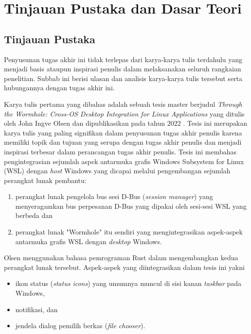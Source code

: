 \chapter{Tinjauan Pustaka dan Dasar Teori}

\section{Tinjauan Pustaka}

Penyusunan tugas akhir ini tidak terlepas dari karya-karya tulis terdahulu yang menjadi basis ataupun inspirasi penulis dalam melaksanakan seluruh rangkaian penelitian. Subbab ini berisi ulasan dan analisis karya-karya tulis tersebut serta hubungannya dengan tugas akhir ini.

Karya tulis pertama yang dibahas adalah sebuah tesis master berjudul \textit{Through the Wormhole: Cross-OS Desktop Integration for Linux Applications} yang ditulis oleh John Ingve Olsen dan dipublikasikan pada tahun 2022 \cite{olsen-2022-through-the-wormhole}. Tesis ini merupakan karya tulis yang paling signifikan dalam penyusunan tugas akhir penulis karena memiliki topik dan tujuan yang serupa dengan tugas akhir penulis dan menjadi inspirasi terbesar dalam perancangan tugas akhir penulis. Tesis ini membahas pengintegrasian sejumlah aspek antarmuka grafis Windows Subsystem for Linux (WSL) dengan \textit{host} Windows yang dicapai melalui pengembangan sejumlah perangkat lunak pembantu:
\begin{enumerate}
    \item perangkat lunak pengelola bus sesi D-Bus (\textit{session manager}) yang menyeragamkan bus perpesanan D-Bus yang dipakai oleh sesi-sesi WSL yang berbeda dan
    \item perangkat lunak "Wormhole" itu sendiri yang mengintegrasikan aspek-aspek antarmuka grafis WSL dengan \textit{desktop} Windows.
\end{enumerate}
Olsen menggunakan bahasa pemrograman Rust dalam mengembangkan kedua perangkat lunak tersebut. Aspek-aspek yang diintegrasikan dalam tesis ini yakni
\begin{itemize}
    \item ikon status (\textit{status icons}) yang umumnya muncul di sisi kanan \textit{taskbar} pada Windows,
    \item notifikasi, dan
    \item jendela dialog pemilih berkas (\textit{file chooser}).
\end{itemize}
